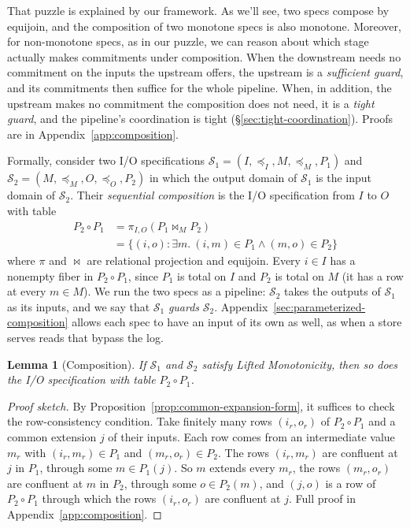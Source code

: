 \documentclass[sigconf]{cidr-2027}
\newtheorem{lemma}{Lemma}
\theoremstyle{remark}
\newcommand{\InputOrd}{\preceq_I}
\newcommand{\OutputOrd}{\preceq_O}
\newcommand{\commitment}{commitment\xspace}
\newcommand{\commitments}{commitments\xspace}
\newcommand{\Spec}{\mathcal{S}}
\newcommand{\spectype}[1][]{I/O specification#1\xspace}
\begin{document}
That puzzle is explained by our framework. As we'll see, two specs compose by equijoin,
and the composition of two monotone specs is also monotone. Moreover, for non-monotone specs,
as in our puzzle, we
can reason about which stage actually makes \commitments under composition. When the
downstream needs no \commitment on the inputs the upstream offers, the
upstream is a \emph{sufficient guard}, and its \commitments then suffice for
the whole pipeline. When, in addition, the upstream makes no \commitment the
composition does not need, it is a \emph{tight guard}, and the pipeline's
coordination is tight (\S\ref{sec:tight-coordination}). Proofs are in
Appendix~\ref{app:composition}.
\label{sec:sequential-composition}

\textcolor{reviewed}{Formally, consider two \spectype[s]
${\Spec_1=(I,\InputOrd,M,\preceq_M,P_1)}$ and
${\Spec_2=(M,\preceq_M,O,\OutputOrd,P_2)}$
in which the output domain of $\Spec_1$ is the input domain of $\Spec_2$.} \textcolor{reviewed}{Their
\emph{sequential composition} is the \spectype from $I$ to $O$ with table}
\begin{equation}
\begin{split}
  P_2\circ P_1
  &=\pi_{I,O}(P_1\Join_M P_2)\\
  &=\{(i,o):\exists m.\ (i,m)\in P_1\land(m,o)\in P_2\}
\end{split}
  \label{eq:spec-composition}
\end{equation}
\textcolor{reviewed}{where $\pi$ and $\Join$ are relational projection and equijoin.} Every $i\in I$
has a nonempty fiber in $P_2\circ P_1$, since $P_1$ is total on $I$ and $P_2$ is
total on $M$ (it has a row at every $m\in M$). \textcolor{reviewed}{We run the two specs as a pipeline: $\Spec_2$ takes the outputs of $\Spec_1$ as
its inputs, and we say that $\Spec_1$ \emph{guards} $\Spec_2$.} Appendix~\ref{sec:parameterized-composition} allows each spec to have an input
of its own as well, as when a store serves reads that bypass the log.

\begin{lemma}[Composition]
\label{lem:composition}
\textcolor{reviewed}{If $\Spec_1$ and $\Spec_2$ satisfy Lifted Monotonicity, then so does the \spectype with table $P_2\circ P_1$.}
\end{lemma}

\begin{proof}[Proof sketch]
By Proposition~\ref{prop:common-expansion-form}, it suffices to check the
row-consistency condition. Take finitely many rows $(i_r,o_r)$ of $P_2\circ P_1$ and a common extension $j$ of their inputs. Each row comes from an intermediate value $m_r$ with $(i_r,m_r)\in P_1$ and $(m_r,o_r)\in P_2$. The rows $(i_r,m_r)$ are confluent at $j$ in $P_1$, through some $m\in P_1(j)$. So $m$ extends every $m_r$, the rows $(m_r,o_r)$ are confluent at $m$ in $P_2$, through some $o\in P_2(m)$, and $(j,o)$ is a row of $P_2\circ P_1$ through which the rows $(i_r,o_r)$ are confluent at $j$. Full proof
in Appendix~\ref{app:composition}.
\end{proof}
\end{document}
